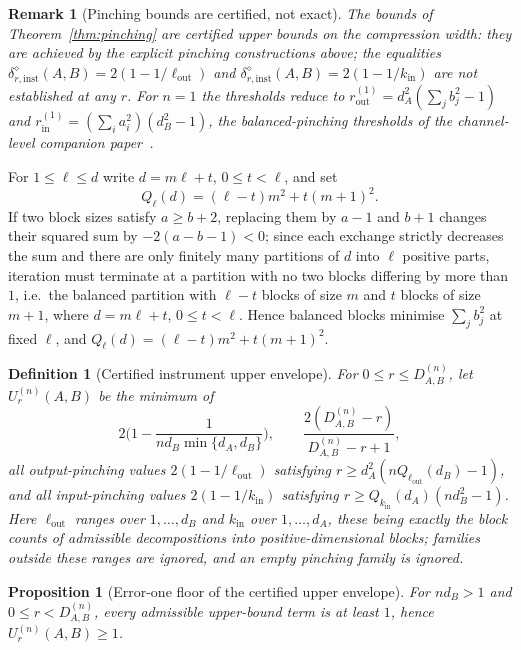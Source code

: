 \documentclass[11pt,a4paper]{article}
\newtheorem{proposition}[theorem]{Proposition}
\newtheorem{definition}[theorem]{Definition}
\newtheorem{remark}[theorem]{Remark}
\begin{document}
\begin{remark}[Pinching bounds are certified, not exact]
\label{rem:pinching-certified}
The bounds of Theorem~\ref{thm:pinching} are certified upper bounds on the compression width: they are achieved by the explicit pinching constructions above; the equalities $\delta_{r,\mathrm{inst}}^{\diamond}(A,B)=2(1-1/\ell_{\mathrm{out}})$ and $\delta_{r,\mathrm{inst}}^{\diamond}(A,B)=2(1-1/k_{\mathrm{in}})$ are not established at any $r$. For $n=1$ the thresholds reduce to $r_{\mathrm{out}}^{(1)}=d_A^2(\sum_jb_j^2-1)$ and $r_{\mathrm{in}}^{(1)}=(\sum_ia_i^2)(d_B^2-1)$, the balanced-pinching thresholds of the channel-level companion paper~\cite{CompanionChannels}.
\end{remark}

For $1\le\ell\le d$ write $d=m\ell+t$, $0\le t<\ell$, and set
\[
Q_\ell(d)=(\ell-t)m^2+t(m+1)^2.
\]
If two block sizes satisfy $a\ge b+2$, replacing them by $a-1$ and $b+1$ changes their squared sum by $-2(a-b-1)<0$; since each exchange strictly decreases the sum and there are only finitely many partitions of $d$ into $\ell$ positive parts, iteration must terminate at a partition with no two blocks differing by more than $1$, i.e.\ the balanced partition with $\ell-t$ blocks of size $m$ and $t$ blocks of size $m+1$, where $d=m\ell+t$, $0\le t<\ell$. Hence balanced blocks minimise $\sum_jb_j^2$ at fixed $\ell$, and $Q_\ell(d)=(\ell-t)m^2+t(m+1)^2$.

\begin{definition}[Certified instrument upper envelope]
\label{def:upper}
For $0\le r\le D_{A,B}^{(n)}$, let $U_r^{(n)}(A,B)$ be the minimum of
\[
2\Big(1-\frac1{nd_B\min\{d_A,d_B\}}\Big),\qquad
\frac{2(D_{A,B}^{(n)}-r)}{D_{A,B}^{(n)}-r+1},
\]
all output-pinching values $2(1-1/\ell_{\mathrm{out}})$ satisfying $r\ge d_A^2(nQ_{\ell_{\mathrm{out}}}(d_B)-1)$, and all input-pinching values $2(1-1/k_{\mathrm{in}})$ satisfying $r\ge Q_{k_{\mathrm{in}}}(d_A)(nd_B^2-1)$. Here $\ell_{\mathrm{out}}$ ranges over $1,\dots,d_B$ and $k_{\mathrm{in}}$ over $1,\dots,d_A$, these being exactly the block counts of admissible decompositions into positive-dimensional blocks; families outside these ranges are ignored, and an empty pinching family is ignored.
\end{definition}

\begin{proposition}[Error-one floor of the certified upper envelope]
\label{prop:floor}
For $nd_B>1$ and $0\le r<D_{A,B}^{(n)}$, every admissible upper-bound term is at least $1$, hence $U_r^{(n)}(A,B)\ge1$.
\end{proposition}
\end{document}
